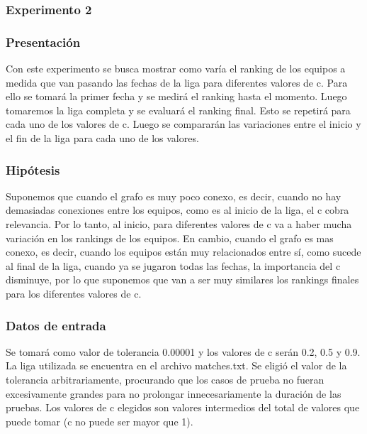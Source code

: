         \subsubsection{Experimento 2}
        \subsubsection*{Presentación}
        Con este experimento se busca mostrar como varía el ranking de los equipos a medida que van pasando las fechas de la liga para diferentes valores de c. Para ello se tomará la primer fecha y se medirá el ranking hasta el momento. Luego tomaremos la liga completa y se evaluará el ranking final. Esto se repetirá para cada uno de los valores de c. Luego se compararán las variaciones entre el inicio y el fin de la liga para cada uno de los valores.

            \subsubsection*{Hipótesis}
            Suponemos que cuando el grafo es muy poco conexo, es decir, cuando no hay demasiadas conexiones entre los equipos, como es al inicio de la liga, el c cobra relevancia. Por lo tanto, al inicio, para diferentes valores de c va a haber mucha variación en los rankings de los equipos. En cambio, cuando el grafo es mas conexo, es decir, cuando los equipos están muy relacionados entre sí, como sucede al final de la liga, cuando ya se jugaron todas las fechas, la importancia del c disminuye, por lo que suponemos que van a ser muy similares los rankings finales para los diferentes valores de c.

            \subsubsection*{Datos de entrada}
            Se tomará como valor de tolerancia 0.00001 y los valores de c serán 0.2, 0.5 y 0.9. La liga utilizada se encuentra en el archivo matches.txt. Se eligió el valor de la tolerancia arbitrariamente, procurando que los casos de prueba no fueran excesivamente grandes para no prolongar innecesariamente la duración de las pruebas. Los valores de c elegidos son valores intermedios del total de valores que puede tomar (c no puede ser mayor que 1).

